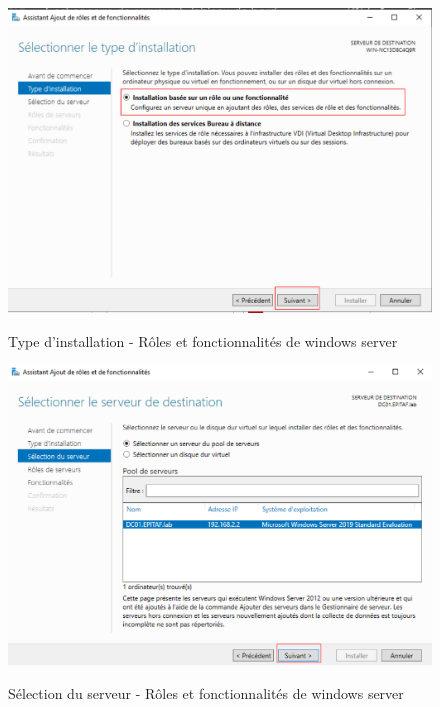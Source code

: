 \begin{figure}[h!]
	\begin{center}
		\caption{Type d'installation - Rôles et fonctionnalités de windows server}
		\includegraphics[scale=0.7]{WS_Screenshots/31.png}
		\label{Funcs_WinS/3}
	\end{center}
\end{figure}
\FloatBarrier 
    

\begin{figure}[h!]
	\begin{center}
		\caption{Sélection du serveur - Rôles et fonctionnalités de windows server}
		\includegraphics[scale=0.8]{WS_Screenshots/32.png}
		\label{Funcs_WinS/4}
	\end{center}
\end{figure}
\FloatBarrier 
    

